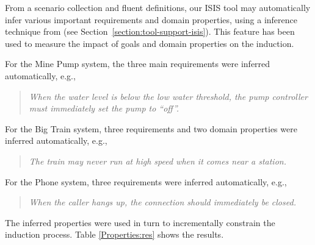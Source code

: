 From a scenario collection and fluent definitions, our ISIS tool may automatically infer various important requirements and domain properties, using a inference technique from \cite{Damas:2006, Damas:2011} (see Section~\ref{section:tool-support-isis}). This feature has been used to measure the impact of goals and domain properties on the induction.

For the Mine Pump system, the three main requirements were inferred automatically, e.g.,
\begin{quote}
\emph{When the water level is below the low water threshold, the pump controller must immediately set the pump to “off”.}
\end{quote}

For the Big Train system, three requirements and two domain properties were inferred automatically, e.g.,
\begin{quote}
\emph{The train may never run at high speed when it comes near a station.}
\end{quote}

For the Phone system, three requirements were inferred automatically, e.g.,

\begin{quote}
\emph{When the caller hangs up, the connection should immediately be closed.}
\end{quote}

The inferred properties were used in turn to incrementally constrain the induction process. Table \ref{Properties:res} shows the results. 

